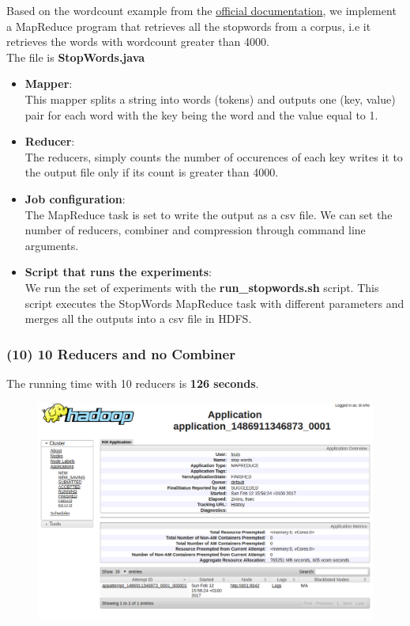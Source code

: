 \documentclass[a4paper,12pt]{article}
\begin{document}
Based on the wordcount example from the \href{https://hadoop.apache.org/docs/stable/hadoop-mapreduce-client/hadoop-mapreduce-client-core/MapReduceTutorial.html}{official documentation},
we implement a MapReduce program that retrieves all the stopwords from a corpus,
i.e it retrieves the words with wordcount greater than 4000.
\\The file is \textbf{StopWords.java}
\begin{itemize}
  \item \textbf{Mapper}:\\
  This mapper splits a string into words (tokens) and outputs one (key, value) pair
  for each word with the key being the word and the value equal to 1.
  
  \item \textbf{Reducer}:\\
  The reducers, simply counts the number of occurences of each key writes it to
  the output file only if its count is greater than 4000.
  
  \item \textbf{Job configuration}:\\
  The MapReduce task is set to write the output as a csv file.
  We can set the number of reducers, combiner and compression through command line
  arguments.
  
  \item \textbf{Script that runs the experiments}:\\
  We run the set of experiments with the \textbf{run\_stopwords.sh} script.
  This script executes the StopWords MapReduce task with different parameters
  and merges all the outputs into a csv file in HDFS.
  

\end{itemize}

\subsubsection{(10) 10 Reducers and no Combiner}
The running time with 10 reducers is \textbf{126 seconds}.
\begin{figure}[!htbp]
  \centering
  \includegraphics[width=.6\textwidth]{stopwords_10_reducers.png}
\end{figure}
\end{document}

